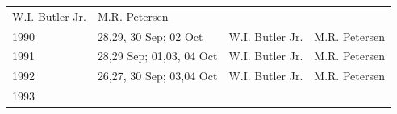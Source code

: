 \documentclass[]{article}
\begin{document}
\begin{longtable}[]{@{}llll@{}}
\begin{minipage}[t]{0.18\columnwidth}
W.I. Butler Jr.\strut
\end{minipage} & \begin{minipage}[t]{0.20\columnwidth}\raggedright\strut
M.R. Petersen\strut
\end{minipage}\tabularnewline
\begin{minipage}[t]{0.12\columnwidth}\raggedright\strut
1990\strut
\end{minipage} & \begin{minipage}[t]{0.38\columnwidth}\raggedright\strut
28,29, 30 Sep; 02 Oct\strut
\end{minipage} & \begin{minipage}[t]{0.18\columnwidth}\raggedright\strut
W.I. Butler Jr.\strut
\end{minipage} & \begin{minipage}[t]{0.20\columnwidth}\raggedright\strut
M.R. Petersen\strut
\end{minipage}\tabularnewline
\begin{minipage}[t]{0.12\columnwidth}\raggedright\strut
1991\strut
\end{minipage} & \begin{minipage}[t]{0.38\columnwidth}\raggedright\strut
28,29 Sep; 01,03, 04 Oct\strut
\end{minipage} & \begin{minipage}[t]{0.18\columnwidth}\raggedright\strut
W.I. Butler Jr.\strut
\end{minipage} & \begin{minipage}[t]{0.20\columnwidth}\raggedright\strut
M.R. Petersen\strut
\end{minipage}\tabularnewline
\begin{minipage}[t]{0.12\columnwidth}\raggedright\strut
1992\strut
\end{minipage} & \begin{minipage}[t]{0.38\columnwidth}\raggedright\strut
26,27, 30 Sep; 03,04 Oct\strut
\end{minipage} & \begin{minipage}[t]{0.18\columnwidth}\raggedright\strut
W.I. Butler Jr.\strut
\end{minipage} & \begin{minipage}[t]{0.20\columnwidth}\raggedright\strut
M.R. Petersen\strut
\end{minipage}\tabularnewline
\begin{minipage}[t]{0.12\columnwidth}\raggedright\strut
1993\strut
\end{minipage} & \begin{minipage}[t]{0.38\columnwidth}\raggedright\strut

\end{minipage}
\end{longtable}
\end{document}
